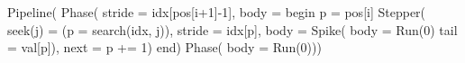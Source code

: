 \begin{juliacode}
Pipeline(
  Phase(
    stride = idx[pos[i+1]-1],
    body = begin
      p = pos[i]
      Stepper(
        seek(j) = (p = search(idx, j)),
        stride = idx[p],
        body = Spike(
          body = Run(0)
          tail = val[p]),
        next = p += 1)
    end)
  Phase(
    body = Run(0)))
\end{juliacode}